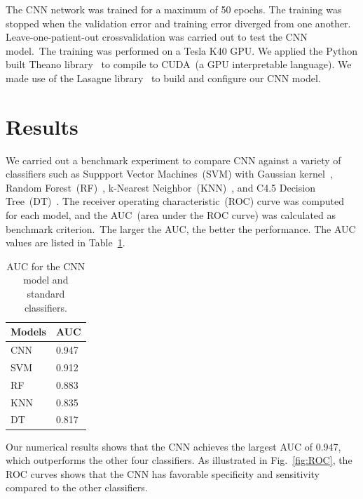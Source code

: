 \documentclass{article}
\begin{document}
The CNN network was trained for a maximum of 50 epochs. The training was stopped when the validation error and training error diverged from one another.
Leave-one-patient-out crossvalidation was carried out to test the CNN model.~The training was performed on a Tesla K40 GPU. We applied the Python built Theano library~\cite{bergstra+al:2010-scipy,Bastien-Theano-2012} to compile to CUDA~(a GPU interpretable language). We made use of the Lasagne library~\cite{sander_dieleman_2015_27878} to build and configure our CNN model.

\section{Results}
\label{sec:Benchmark}

We carried out a benchmark experiment to compare CNN against a variety of classifiers such as Suppport Vector Machines~(SVM) with Gaussian kernel~\cite{hearst1998support}, Random Forest~(RF)~\cite{svetnik2003random}, k-Nearest Neighbor~(KNN)~\cite{peterson2009k}, and C4.5 Decision Tree~(DT)~\cite{quinlan1986induction}.
The receiver operating characteristic~(ROC) curve was computed for each model, and the AUC~(area under the ROC curve) was calculated as benchmark criterion.~The larger the AUC, the better the performance. The AUC values are listed in Table~\ref{tab:AUC}.

\begin{table}[htb]
    \centering

    \begin{tabular}{|l|l|}
    \hline
    Models & AUC    \\ \hline
    CNN    & 0.947 \\
    SVM    & 0.912 \\
    RF     & 0.883 \\
    KNN    & 0.835 \\
    DT     & 0.817 \\ \hline
    \end{tabular}

    \caption{AUC for the CNN model and standard classifiers.}
    \label{tab:AUC}

\end{table}

Our numerical results shows that the CNN achieves the largest AUC of 0.947, which outperforms the other four classifiers. As illustrated in Fig.~\ref{fig:ROC}, the ROC curves shows that the CNN has favorable specificity and sensitivity compared to the other classifiers.
\end{document}
